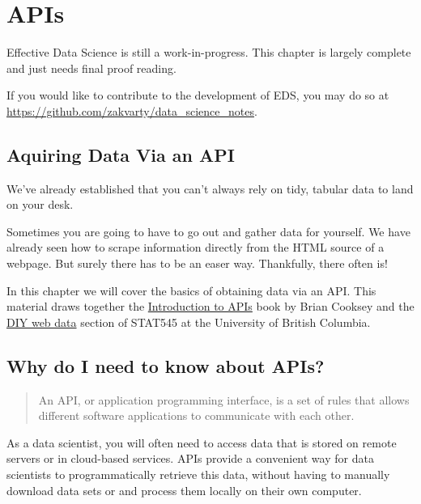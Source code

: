 \documentclass[
  12pt,
]{book}
\begin{document}
\hypertarget{data-apis}{%
\chapter{APIs}\label{data-apis}}

Effective Data Science is still a work-in-progress. This chapter is largely complete and just needs final proof reading.

If you would like to contribute to the development of EDS, you may do so at \url{https://github.com/zakvarty/data_science_notes}.

\hypertarget{aquiring-data-via-an-api}{%
\section{Aquiring Data Via an API}\label{aquiring-data-via-an-api}}

We've already established that you can't always rely on tidy, tabular data to land on your desk.

Sometimes you are going to have to go out and gather data for yourself. We have already seen how to scrape information directly from the HTML source of a webpage. But surely there has to be an easer way. Thankfully, there often is!

In this chapter we will cover the basics of obtaining data via an API. This material draws together the \href{https://zapier.com/learn/apis/}{Introduction to APIs} book by Brian Cooksey and the \href{https://stat545.com/diy-web-data.html\#interacting-with-an-api}{DIY web data} section of STAT545 at the University of British Columbia.

\hypertarget{why-do-i-need-to-know-about-apis}{%
\section{Why do I need to know about APIs?}\label{why-do-i-need-to-know-about-apis}}

\begin{quote}
An API, or application programming interface, is a set of rules that allows different software applications to communicate with each other.
\end{quote}

As a data scientist, you will often need to access data that is stored on remote servers or in cloud-based services. APIs provide a convenient way for data scientists to programmatically retrieve this data, without having to manually download data sets or and process them locally on their own computer.
\end{document}
